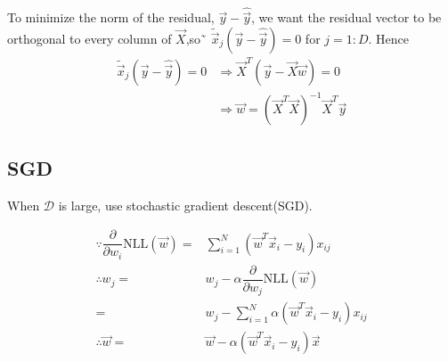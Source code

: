\documentclass[]{article}
\begin{document}
To minimize the norm of the residual, $\vec{y}-\hat{\vec{y}}$, we want the residual vector to be orthogonal to every column of $\vec{X}$,so˜ $\tilde{\vec{x}}_j(\vec{y}-\hat{\vec{y}})=0$ for $j=1:D$. Hence
\begin{equation}\begin{split}
\tilde{\vec{x}}_j(\vec{y}-\hat{\vec{y}})=0 & \Rightarrow \vec{X}^T(\vec{y}-\vec{X}\vec{w})=0 \\
& \Rightarrow \vec{w}=(\vec{X}^T\vec{X})^{-1}\vec{X}^T\vec{y}
\end{split}\end{equation}


\subsection{SGD}
When $\mathcal{D}$ is large, use stochastic gradient descent(SGD).

\begin{align}
\because \dfrac{\partial}{\partial w_i}\text{NLL}(\vec{w})=& \sum\limits_{i=1}^N (\vec{w}^T\vec{x}_i-y_i)x_{ij} \\
\therefore w_j=& w_j - \alpha\dfrac{\partial}{\partial w_j}\text{NLL}(\vec{w}) \nonumber \\
=& w_j - \sum\limits_{i=1}^N \alpha(\vec{w}^T\vec{x}_i-y_i)x_{ij} \\
\therefore \vec{w}=& \vec{w}-\alpha(\vec{w}^T\vec{x}_i-y_i)\vec{x}
\end{align}
\end{document}
